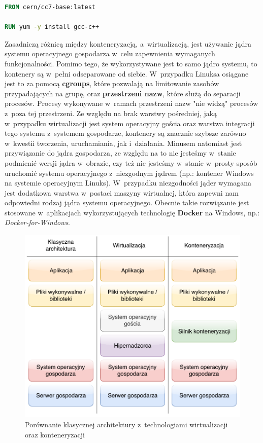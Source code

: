 \begin{lstlisting}[label={lis:dockerfile}, language=Dockerfile, caption={Przykładowy Dockerfile}]
FROM cern/cc7-base:latest

RUN yum -y install gcc-c++
\end{lstlisting}

Zasadniczą różnicą między konteneryzacją, a~wirtualizacją, jest używanie jądra systemu operacyjnego gospodarza w~celu zapewnienia wymaganych funkcjonalności. Pomimo tego, że wykorzystywane jest to samo jądro systemu, to kontenery są w~pełni odseparowane od siebie. W~przypadku Linuksa osiągane jest to za pomocą \textbf{cgroups}, które pozwalają na limitowanie zasobów przypadających na grupę, oraz \textbf{przestrzeni nazw}, które służą do separacji procesów. Procesy wykonywane w~ramach przestrzeni nazw "nie widzą" procesów z~poza tej przestrzeni. Ze względu na brak warstwy pośredniej, jaką w~przypadku wirtualizacji jest system operacyjny gościa oraz warstwa integracji tego systemu z~systemem gospodarze, kontenery są znacznie szybsze zarówno w~kwestii tworzenia, uruchamiania, jak i~działania. Minusem natomiast jest przywiązanie do jądra gospodarza, ze względu na to nie jesteśmy w~stanie podmienić wersji jądra w~obrazie, czy też nie jesteśmy w~stanie w~prosty sposób uruchomić systemu operacyjnego z~niezgodnym jądrem (np.: kontener Windows na systemie operacyjnym Linuks). W~przypadku niezgodności jąder wymagana jest dodatkowa warstwa w~postaci maszyny wirtualnej, która zapewni nam odpowiedni rodzaj jądra systemu operacyjnego. Obecnie takie rozwiązanie jest stosowane w~aplikacjach wykorzystujących technologię \textbf{Docker} na Windows, np.: \textit{Docker-for-Windows}. \cite{Kont2} \cite{Kont3}

\begin{figure} [H]
\centering
\caption{Porównanie klasycznej architektury z~technologiami wirtualizacji oraz konteneryzacji \cite{Kont4}}
\includegraphics[width=\textwidth]{res/virtualizationAndContenerizatrionComparison}
\end{figure}